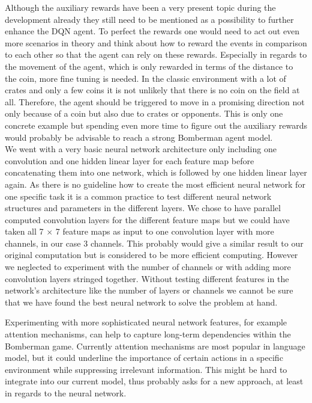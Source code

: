 Although the auxiliary rewards have been a very present topic during the development already they still need to be mentioned as a possibility to further enhance the DQN agent. To perfect the rewards one would need to act out even more scenarios in theory and think about how to reward the events in comparison to each other so that the agent can rely on these rewards. Especially in regards to the movement of the agent, which is only rewarded in terms of the distance to the coin, more fine tuning is needed. In the classic environment with a lot of crates and only a few coins it is not unlikely that there is no coin on the field at all. Therefore, the agent should be triggered to move in a promising direction not only because of a coin but also due to crates or opponents. This is only one concrete example but spending even more time to figure out the auxiliary rewards would probably be advisable to reach a strong Bomberman agent model. \\

We went with a very basic neural network architecture only including one convolution and one hidden linear layer for each feature map before concatenating them into one network, which is followed by one hidden linear layer again. As there is no guideline how to create the most efficient neural network for one specific task it is a common practice to test different neural network structures and parameters in the different layers. We chose to have parallel computed convolution layers for the different feature maps but we could have taken all 7 $\times$ 7 feature maps as input to one convolution layer with more channels, in our case 3 channels. This probably would give a similar result to our original computation but is considered to be more efficient computing. However we neglected to experiment with the number of channels or with adding more convolution layers stringed together. Without testing different features in the network's architecture like the number of layers or channels we cannot be sure that we have found the best neural network to solve the problem at hand.

Experimenting with more sophisticated neural network features, for example attention mechanisms, can help to capture long-term dependencies within the Bomberman game. Currently attention mechanisms are most popular in language model, but it could underline the importance of certain actions in a specific environment while suppressing irrelevant information. This might be hard to integrate into our current model, thus probably asks for a new approach, at least in regards to the neural network.

